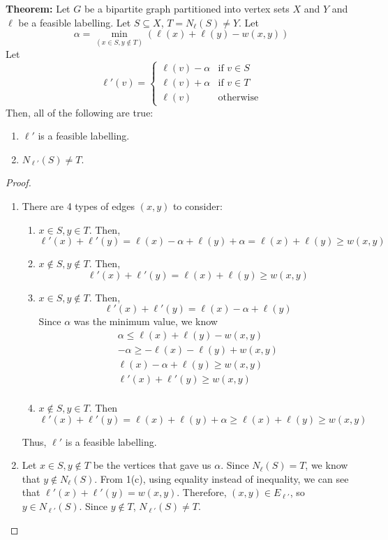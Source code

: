 \documentclass[12pt]{article}
\newcommand{\thm}{\noindent \textbf{Theorem: }}
\newcommand{\lskip}{\vspace{\baselineskip}}
\begin{document}
\thm Let $G$ be a bipartite graph partitioned into vertex sets $X$ and $Y$ and $\ell$ be a feasible labelling. Let $S \subseteq X$, $T = N_\ell(S) \neq Y$. Let \[ \alpha = \min_{(x \in S, y \notin T)} (\ell(x) + \ell(y) - w(x,y)) \]
Let
\[ \ell'(v) =
  \begin{cases}
    \ell(v) - \alpha & \text{if } v \in S \\
    \ell(v) + \alpha & \text{if } v \in T \\
    \ell(v) & \text{otherwise}
  \end{cases}
\]
Then, all of the following are true:
\begin{enumerate}
  \item $\ell'$ is a feasible labelling.
  \item $N_{\ell'}(S) \neq T$.
\end{enumerate}
\lskip
\begin{proof}  $ $\newline
  \begin{enumerate}
    \item There are 4 types of edges $(x,y)$ to consider:
    \begin{enumerate}
      \item $x \in S, y \in T$.
      Then,
      \[ \ell'(x) + \ell'(y) = \ell(x) - \alpha + \ell(y) + \alpha = \ell(x) + \ell(y) \geq w(x,y) \]
      \item $x \notin S, y \notin T$.
      Then,
      \[ \ell'(x) + \ell'(y) = \ell(x) + \ell(y) \geq w(x,y) \]
      \item $x \in S, y \notin T$.
      Then,
      \[ \ell'(x) + \ell'(y) = \ell(x) - \alpha + \ell(y) \]
      Since $\alpha$ was the minimum value, we know
      \begin{align*}
        \alpha \leq \ell(x) + \ell(y) - w(x,y) \\
        -\alpha \geq -\ell(x) - \ell(y) + w(x,y) \\
        \ell(x) - \alpha + \ell(y) \geq w(x,y) \\
        \ell'(x) + \ell'(y) \geq w(x,y) \\
      \end{align*}
      \item $x \notin S, y \in T$. Then
      \[ \ell'(x) + \ell'(y) = \ell(x) + \ell(y) + \alpha \geq \ell(x) + \ell(y) \geq w(x,y) \]
    \end{enumerate}
    Thus, $\ell'$ is a feasible labelling.

    \item Let $x \in S, y \notin T$ be the vertices that gave us $\alpha$. Since $N_\ell(S) = T$, we know that $y \notin N_\ell(S)$. From 1(c), using equality instead of inequality, we can see that $\ell'(x) + \ell'(y) = w(x,y)$. Therefore, $(x,y) \in E_{\ell'}$, so $y \in N_{\ell'}(S)$. Since $y \notin T$, $N_{\ell'}(S) \neq T$.
  \end{enumerate}
\end{proof}
\lskip
\end{document}

